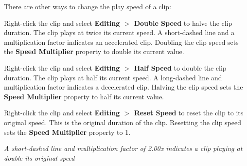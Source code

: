 There are other ways to change the play speed of a clip\+:


\begin{DoxyItemize}
\item Right-\/click the clip and select {\bfseries{Editing \texorpdfstring{$>$}{>} Double Speed}} to halve the clip duration. The clip plays at twice its current speed. A short-\/dashed line and a multiplication factor indicates an accelerated clip. Doubling the clip speed sets the {\bfseries{Speed Multiplier}} property to double its current value.
\item Right-\/click the clip and select {\bfseries{Editing \texorpdfstring{$>$}{>} Half Speed}} to double the clip duration. The clip plays at half its current speed. A long-\/dashed line and multiplication factor indicates a decelerated clip. Halving the clip speed sets the {\bfseries{Speed Multiplier}} property to half its current value.
\item Right-\/click the clip and select {\bfseries{Editing \texorpdfstring{$>$}{>} Reset Speed}} to reset the clip to its original speed. This is the original duration of the clip. Resetting the clip speed sets the {\bfseries{Speed Multiplier}} property to 1.
\end{DoxyItemize}



{\itshape A short-\/dashed line and multiplication factor of 2.\+00x indicates a clip playing at double its original speed} 